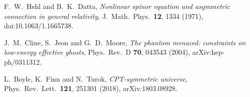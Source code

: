 F.~W.~Hehl and B.~K.~Datta, \emph{Nonlinear spinor equation and asymmetric connection in general relativity},
J.\ Math.\ Phys.\ \textbf{12}, 1334 (1971), doi:10.1063/1.1665738.

J.~M.~Cline, S.~Jeon and G.~D.~Moore, \emph{The phantom menaced: constraints on low-energy effective ghosts},
Phys.\ Rev.\ D \textbf{70}, 043543 (2004), arXiv:hep-ph/0311312.

L.~Boyle, K.~Finn and N.~Turok, \emph{CPT-symmetric universe}, Phys.\ Rev.\ Lett.\ \textbf{121}, 251301 (2018),
arXiv:1803.08928.
